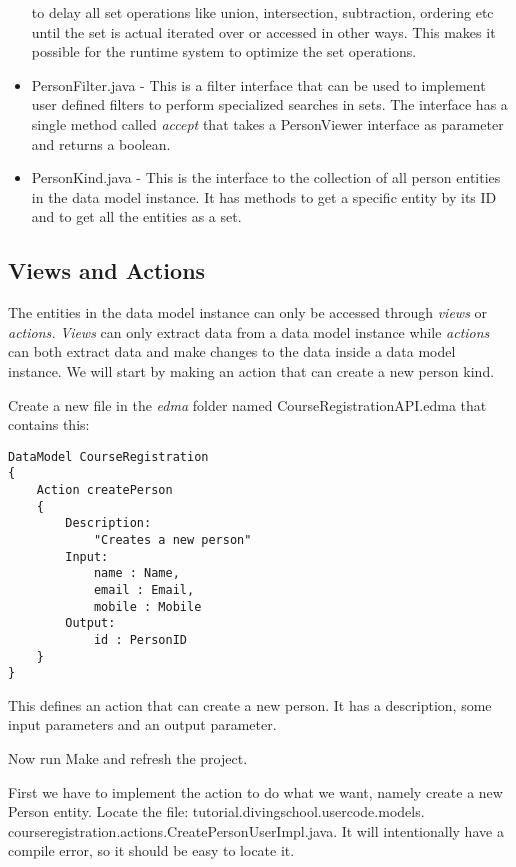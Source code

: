 \begin{itemize}
to delay all set operations like union, intersection, subtraction,
ordering etc until the set is actual iterated over or accessed in
other ways. This makes it possible for the runtime system to optimize
the set operations.
\item PersonFilter.java - This is a filter interface that can be used to
implement user defined filters to perform specialized searches in
sets. The interface has a single method called \emph{accept} that
takes a PersonViewer interface as parameter and returns a boolean.
\item PersonKind.java - This is the interface to the collection of all person
entities in the data model instance. It has methods to get a specific
entity by its ID and to get all the entities as a set. 
\end{itemize}

\subsection{Views and Actions}

The entities in the data model instance can only be accessed through
\emph{views} or \emph{actions.} \emph{Views} can only extract data
from a data model instance while \emph{actions} can both extract data
and make changes to the data inside a data model instance. We will
start by making an action that can create a new person kind.

Create a new file in the \emph{edma} folder named CourseRegistrationAPI.edma
that contains this:
\begin{lstlisting}[basicstyle={\scriptsize}]
DataModel CourseRegistration
{
	Action createPerson
	{
		Description:
			"Creates a new person"
		Input: 
			name : Name,
			email : Email,
			mobile : Mobile
		Output:
			id : PersonID
	}
}
\end{lstlisting}


This defines an action that can create a new person. It has a description,
some input parameters and an output parameter.

Now run Make and refresh the project. 

First we have to implement the action to do what we want, namely create
a new Person entity. Locate the file: tutorial.divingschool.usercode.models.
courseregistration.actions.CreatePersonUserImpl.java. It will intentionally
have a compile error, so it should be easy to locate it.

